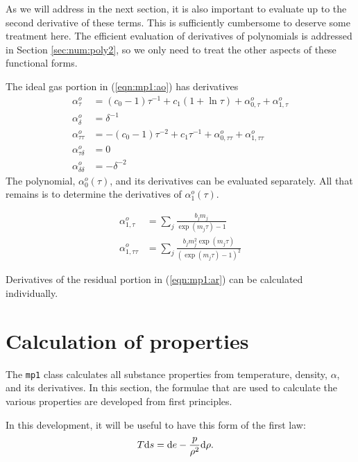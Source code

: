 As we will address in the next section, it is also important to evaluate up to the second derivative of these terms.  This is sufficiently cumbersome to deserve some treatment here.  The efficient evaluation of derivatives of polynomials is addressed in Section \ref{sec:num:poly2}, so we only need to treat the other aspects of these functional forms.

The ideal gas portion in (\ref{eqn:mp1:ao}) has derivatives
\begin{subequations}
\begin{align}
\alpha^o_\tau &= (c_0-1)\tau^{-1} + c_1 (1 + \ln \tau) + \alpha^o_{0,\tau} + \alpha^o_{1,\tau}\\
\alpha^o_\delta &= \delta^{-1}\\
\alpha^o_{\tau\tau} &= -(c_0-1)\tau^{-2} + c_1 \tau^{-1} + \alpha^o_{0,\tau\tau} + \alpha^o_{1,\tau\tau}\\
\alpha^o_{\tau\delta} &= 0\\
\alpha^o_{\delta\delta} &= -\delta^{-2}
\end{align}
\end{subequations}
The polynomial, $\alpha^o_0(\tau)$, and its derivatives can be evaluated separately.  All that remains is to determine the derivatives of $\alpha^o_1(\tau)$.

\begin{subequations}
\begin{align}
\alpha^o_{1,\tau} &= \sum_j \frac{b_j m_j}{\exp(m_j \tau) - 1}\\
\alpha^o_{1,\tau\tau} &= \sum_j \frac{b_j m_j^2 \exp(m_j \tau)}{(\exp(m_j \tau) - 1)^{2}}
\end{align}
\end{subequations}

Derivatives of the residual portion in (\ref{eqn:mp1:ar}) can be calculated individually.


\section{Calculation of properties}\label{sec:mp1:properties}

The \texttt{mp1} class calculates all substance properties from temperature, density, $\alpha$, and its derivatives.  In this section, the formulae that are used to calculate the various properties are developed from first principles.

In this development, it will be useful to have this form of the first law:
\begin{align}
T\mathrm{d} s &= \mathrm{d} e - \frac{p}{\rho^2} \mathrm{d} \rho\label{eqn:mp1:law1}.
\end{align}

